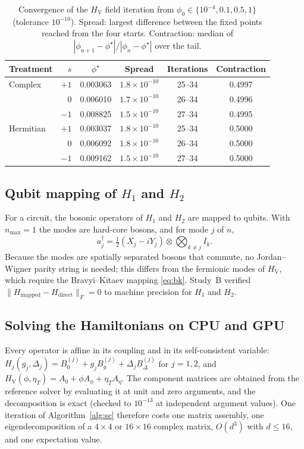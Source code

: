 \documentclass[conference]{IEEEtran}
\newcommand{\HV}{H_{\mathrm{V}}}
\newcommand{\ad}{^{\dagger}}
\begin{document}
\begin{table}[t]
\centering
\caption{Convergence of the $\HV$ field iteration from $\phi_0\in\{10^{-4},0.1,0.5,1\}$ (tolerance $10^{-10}$). Spread: largest difference between the fixed points reached from the four starts. Contraction: median of $|\phi_{n+1}-\phi^\star|/|\phi_n-\phi^\star|$ over the tail.}
\label{tab:conv}
\footnotesize
\setlength{\tabcolsep}{3pt}
\begin{tabular}{lrcccc}
\toprule
Treatment & $s$ & $\phi^\star$ & Spread & Iterations & Contraction\\
\midrule
Complex & $+1$ & 0.003063 & $1.8{\times}10^{-10}$ & 25--34 & 0.4997\\
 & $0$ & 0.006010 & $1.7{\times}10^{-10}$ & 26--34 & 0.4996\\
 & $-1$ & 0.008825 & $1.5{\times}10^{-10}$ & 27--34 & 0.4995\\
Hermitian & $+1$ & 0.003037 & $1.8{\times}10^{-10}$ & 25--34 & 0.5000\\
 & $0$ & 0.006092 & $1.8{\times}10^{-10}$ & 26--34 & 0.5000\\
 & $-1$ & 0.009162 & $1.5{\times}10^{-10}$ & 27--34 & 0.5000\\
\bottomrule
\end{tabular}
\end{table}

\subsection{Qubit mapping of \texorpdfstring{$H_1$ and $H_2$}{H1 and H2}}\label{sec:qmap}
For a circuit, the bosonic operators of $H_1$ and $H_2$ are mapped to qubits. With $n_{\max}=1$ the modes are hard-core bosons, and for mode $j$ of $n$,
\begin{equation}
a_j\ad=\tfrac12(X_j-iY_j)\otimes\textstyle\bigotimes_{k\ne j}I_k .
\label{eq:jw}
\end{equation}
Because the modes are spatially separated bosons that commute, no Jordan--Wigner parity string is needed; this differs from the fermionic modes of $\HV$, which require the Bravyi--Kitaev mapping \eqref{eq:bk}. Study~B verified $\|H_{\mathrm{mapped}}-H_{\mathrm{direct}}\|_F=0$ to machine precision for $H_1$ and $H_2$.

\subsection{Solving the Hamiltonians on CPU and GPU}\label{sec:cpugpu}
Every operator is affine in its coupling and in its self-consistent variable: $H_j(g_j,\Delta_j)=B^{(j)}_0+g_jB^{(j)}_g+\Delta_jB^{(j)}_\Delta$ for $j=1,2$, and $\HV(\phi,\eta_T)=A_0+\phi A_\phi+\eta_TA_\eta$. The component matrices are obtained from the reference solver by evaluating it at unit and zero arguments, and the decomposition is exact (checked to $10^{-13}$ at independent argument values). One iteration of Algorithm~\ref{alg:sc} therefore costs one matrix assembly, one eigendecomposition of a $4{\times}4$ or $16{\times}16$ complex matrix, $O(d^3)$ with $d\le16$, and one expectation value.
\end{document}
